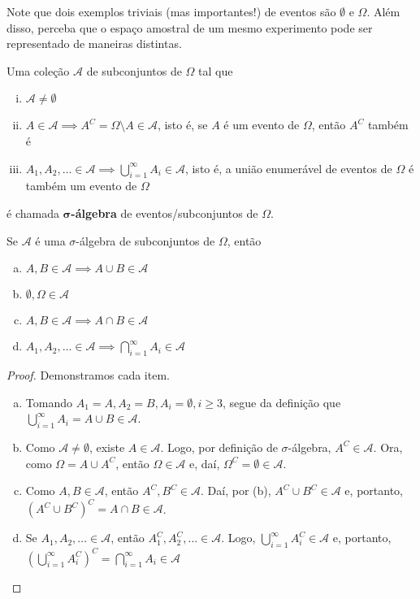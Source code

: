 \documentclass[../Notas.tex]{subfiles}
\begin{document}
\begin{remarks}
Note que dois exemplos triviais (mas importantes!) de eventos são $\emptyset$ e $\Omega$. Além disso, perceba que o espaço amostral de um mesmo experimento pode ser representado de maneiras distintas.
\end{remarks}

\begin{definition}
Uma coleção $\mathcal{A}$ de subconjuntos de $\Omega$ tal que
\begin{enumerate}[(i)]
    \item $\mathcal{A}\neq\emptyset$
    \item $A\in\mathcal{A} \implies A^C = \Omega\setminus A \in\mathcal{A}$, isto é, se $A$ é um evento de $\Omega$, então $A^C$ também é
    \item $A_1,A_2, \dots \in\mathcal{A} \implies \displaystyle{\bigcup_{i=1}^{\infty}}A_i \in\mathcal{A}$, isto é, a união enumerável de eventos de $\Omega$ é também um evento de $\Omega$
\end{enumerate}
é chamada {\bf $\mathbf{\sigma}$-álgebra} de eventos/subconjuntos de $\Omega$.
\end{definition}

\begin{proposition}
Se $\mathcal{A}$ é uma $\sigma$-álgebra de subconjuntos de $\Omega$, então
\begin{enumerate}[(a)]
    \item $A,B \in\mathcal{A} \implies A\cup B\in\mathcal{A}$
    \item $\emptyset, \Omega\in\mathcal{A}$
    \item $A,B \in\mathcal{A} \implies A\cap B\in\mathcal{A}$
    \item $A_1, A_2, \dots\in\mathcal{A} \implies \displaystyle{ \bigcap_{i=1}^{\infty}A_i } \in\mathcal{A}$
\end{enumerate}
\end{proposition}
\begin{proof}
Demonstramos cada item.
\begin{enumerate}[(a)]
    \item Tomando $A_1 = A, A_2 = B, A_i = \emptyset, i\geq 3$, segue da definição que $\displaystyle{\bigcup_{i=1}^{\infty}A_i} = A\cup B \in\mathcal{A}$.
    \item Como $\mathcal{A}\neq\emptyset$, existe $A\in\mathcal{A}$. Logo, por definição de $\sigma$-álgebra, $A^C\in\mathcal{A}$. Ora, como $\Omega = A\cup A^C$, então $\Omega\in\mathcal{A}$ e, daí, $\Omega^C = \emptyset\in\mathcal{A}$.
    \item Como $A, B\in\mathcal{A}$, então $A^C, B^C\in\mathcal{A}$. Daí, por (b), $A^C\cup B^C\in\mathcal{A}$ e, portanto, $(A^C\cup B^C)^C = A\cap B\in\mathcal{A}$.
    \item Se $A_1, A_2, \dots \in\mathcal{A}$, então $A_1^C, A_2^C, \dots \in\mathcal{A}$. Logo, $\displaystyle{\bigcup_{i=1}^{\infty} A_i^C }\in\mathcal{A}$ e, portanto, $\displaystyle{\left(\bigcup_{i=1}^{\infty} A_i^C\right)^C  = \bigcap_{i=1}^{\infty}A_i }\in\mathcal{A}$
\end{enumerate}
\end{proof}
\end{document}
